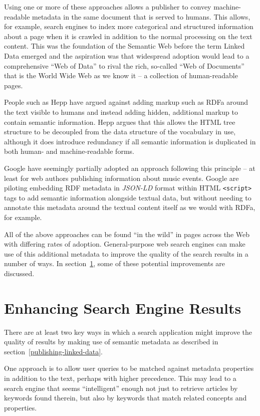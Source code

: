 Using one or more of these approaches allows a publisher to convey
machine-readable metadata in the same document that is served to humans.
This allows, for example, search engines to index more categorical and
structured information about a page when it is crawled in addition to the
normal processing on the text content. This was the foundation of the
Semantic Web\cite{berners2001semantic} before the term Linked Data
emerged and the aspiration was that widespread adoption would lead to
a comprehensive ``Web of Data'' to rival the rich, so-called
``Web of Documents'' that is the World Wide Web as we know it -- a collection
of human-readable pages.

People such as Hepp have argued against adding markup such as RDFa around
the text visible to humans and instead adding hidden, additional markup to
contain semantic information.\cite{hepp2009rdf2rdfa} Hepp argues that
this allows the HTML tree structure to be decoupled from the data structure
of the vocabulary in use, although it does introduce redundancy if all
semantic information is duplicated in both human- and machine-readable forms.

Google have seemingly partially adopted an approach following this principle
-- at least for web authors publishing information about music
events.\cite{googlejsonld} Google are piloting embedding RDF metadata in
\emph{JSON-LD} format within HTML \texttt{<script>} tags to add semantic
information alongside textual data, but without needing to annotate this metadata
around the textual content itself as we would with RDFa, for example.

All of the above approaches can be found ``in the wild'' in pages across
the Web with differing rates of adoption.\cite{haas2011enhanced}
General-purpose web search
engines can make use of this additional metadata to improve the quality
of the search results in a number of ways. In section~\ref{enhancing-results},
some of these potential improvements are discussed.

\section{Enhancing Search Engine Results}
\label{enhancing-results}

There are at least two key ways in which a search application might
improve the quality of results by making use of semantic metadata as
described in section~\ref{publishing-linked-data}.

One approach is to allow
user queries to be matched against metadata properties in addition
to the text, perhaps with higher precedence. This may lead to a search
engine that seems ``intelligent'' enough not just to retrieve articles
by keywords found therein, but also by keywords that match related
concepts and properties.

